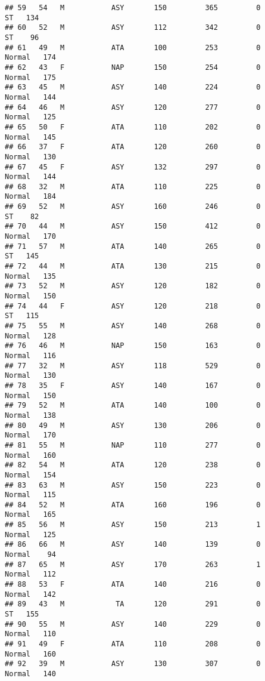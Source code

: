 \documentclass[
]{article}
\begin{document}
\begin{verbatim}
## 59   54   M           ASY       150         365         0         ST   134
## 60   52   M           ASY       112         342         0         ST    96
## 61   49   M           ATA       100         253         0     Normal   174
## 62   43   F           NAP       150         254         0     Normal   175
## 63   45   M           ASY       140         224         0     Normal   144
## 64   46   M           ASY       120         277         0     Normal   125
## 65   50   F           ATA       110         202         0     Normal   145
## 66   37   F           ATA       120         260         0     Normal   130
## 67   45   F           ASY       132         297         0     Normal   144
## 68   32   M           ATA       110         225         0     Normal   184
## 69   52   M           ASY       160         246         0         ST    82
## 70   44   M           ASY       150         412         0     Normal   170
## 71   57   M           ATA       140         265         0         ST   145
## 72   44   M           ATA       130         215         0     Normal   135
## 73   52   M           ASY       120         182         0     Normal   150
## 74   44   F           ASY       120         218         0         ST   115
## 75   55   M           ASY       140         268         0     Normal   128
## 76   46   M           NAP       150         163         0     Normal   116
## 77   32   M           ASY       118         529         0     Normal   130
## 78   35   F           ASY       140         167         0     Normal   150
## 79   52   M           ATA       140         100         0     Normal   138
## 80   49   M           ASY       130         206         0     Normal   170
## 81   55   M           NAP       110         277         0     Normal   160
## 82   54   M           ATA       120         238         0     Normal   154
## 83   63   M           ASY       150         223         0     Normal   115
## 84   52   M           ATA       160         196         0     Normal   165
## 85   56   M           ASY       150         213         1     Normal   125
## 86   66   M           ASY       140         139         0     Normal    94
## 87   65   M           ASY       170         263         1     Normal   112
## 88   53   F           ATA       140         216         0     Normal   142
## 89   43   M            TA       120         291         0         ST   155
## 90   55   M           ASY       140         229         0     Normal   110
## 91   49   F           ATA       110         208         0     Normal   160
## 92   39   M           ASY       130         307         0     Normal   140

\end{verbatim}
\end{document}
